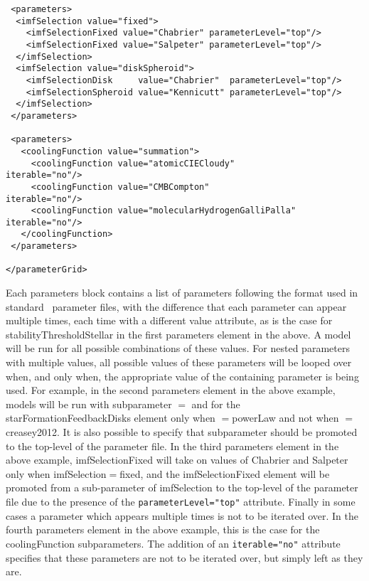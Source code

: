 \begin{verbatim}
 <parameters>
  <imfSelection value="fixed">
    <imfSelectionFixed value="Chabrier" parameterLevel="top"/>
    <imfSelectionFixed value="Salpeter" parameterLevel="top"/>
  </imfSelection>
  <imfSelection value="diskSpheroid">
    <imfSelectionDisk     value="Chabrier"  parameterLevel="top"/>
    <imfSelectionSpheroid value="Kennicutt" parameterLevel="top"/>
  </imfSelection>
 </parameters>

 <parameters>
   <coolingFunction value="summation">
     <coolingFunction value="atomicCIECloudy"             iterable="no"/>
     <coolingFunction value="CMBCompton"                  iterable="no"/>
     <coolingFunction value="molecularHydrogenGalliPalla" iterable="no"/>
   </coolingFunction>
 </parameters>

</parameterGrid>
\end{verbatim}
Each {\normalfont \ttfamily parameters} block contains a list of parameters following the format used in standard \glc\ parameter files, with the difference that each parameter can appear multiple times, each time with a different {\normalfont \ttfamily value} attribute, as is the case for {\normalfont \ttfamily stabilityThresholdStellar} in the first {\normalfont \ttfamily parameters} element in the above. A model will be run for all possible combinations of these values. For nested parameters with multiple values, all possible values of these parameters will be looped over when, and only when, the appropriate value of the containing parameter is being used. For example, in the second {\normalfont \ttfamily parameters} element in the above example, models will be run with subparameter {\normalfont \ttfamily [exponent]}$=${\normalfont {}} and {\normalfont {}} for the {\normalfont \ttfamily starFormationFeedbackDisks} element only when {\normalfont \ttfamily [starFormationFeedbackDisks]}$=${\normalfont \ttfamily powerLaw} and not when {\normalfont \ttfamily [starFormationFeedbackDisks]}$=${\normalfont \ttfamily creasey2012}. It is also possible to specify that subparameter should be promoted to the top-level of the parameter file. In the third {\normalfont \ttfamily parameters} element in the above example, {\normalfont \ttfamily imfSelectionFixed} will take on values of {\normalfont \ttfamily Chabrier} and {\normalfont \ttfamily Salpeter} only when {\normalfont \ttfamily imfSelection}$=${\normalfont \ttfamily fixed}, and the {\normalfont \ttfamily imfSelectionFixed} element will be promoted from a sub-parameter of {\normalfont \ttfamily imfSelection} to the top-level of the parameter file due to the presence of the \verb|parameterLevel="top"| attribute. Finally in some cases a parameter which appears multiple times is not to be iterated over. In the fourth {\normalfont \ttfamily parameters} element in the above example, this is the case for the {\normalfont \ttfamily coolingFunction} subparameters. The addition of an \verb|iterable="no"| attribute specifies that these parameters are not to be iterated over, but simply left as they are.


